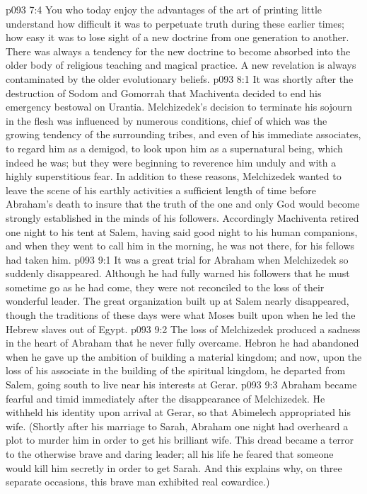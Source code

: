 \pc \vs p093 7:4 You who today enjoy the advantages of the art of printing little understand how difficult it was to perpetuate truth during these earlier times; how easy it was to lose sight of a new doctrine from one generation to another. There was always a tendency for the new doctrine to become absorbed into the older body of religious teaching and magical practice. A new revelation is always contaminated by the older evolutionary beliefs.
\vs p093 8:1 It was shortly after the destruction of Sodom and Gomorrah that Machiventa decided to end his emergency bestowal on Urantia. Melchizedek’s decision to terminate his sojourn in the flesh was influenced by numerous conditions, chief of which was the growing tendency of the surrounding tribes, and even of his immediate associates, to regard him as a demigod, to look upon him as a supernatural being, which indeed he was; but they were beginning to reverence him unduly and with a highly superstitious fear. In addition to these reasons, Melchizedek wanted to leave the scene of his earthly activities a sufficient length of time before Abraham’s death to insure that the truth of the one and only God would become strongly established in the minds of his followers. Accordingly Machiventa retired one night to his tent at Salem, having said good night to his human companions, and when they went to call him in the morning, he was not there, for his fellows had taken him.\plusone
{}
\vs p093 9:1 It was a great trial for Abraham when Melchizedek so suddenly disappeared. Although he had fully warned his followers that he must sometime go as he had come, they were not reconciled to the loss of their wonderful leader. The great organization built up at Salem nearly disappeared, though the traditions of these days were what Moses built upon when he led the Hebrew slaves out of Egypt.
\pc \vs p093 9:2 The loss of Melchizedek produced a sadness in the heart of Abraham that he never fully overcame. Hebron he had abandoned when he gave up the ambition of building a material kingdom; and now, upon the loss of his associate in the building of the spiritual kingdom, he departed from Salem, going south to live near his interests at Gerar.
\vs p093 9:3 Abraham became fearful and timid immediately after the disappearance of Melchizedek. He withheld his identity upon arrival at Gerar, so that Abimelech appropriated his wife. (Shortly after his marriage to Sarah, Abraham one night had overheard a plot to murder him in order to get his brilliant wife. This dread became a terror to the otherwise brave and daring leader; all his life he feared that someone would kill him secretly in order to get Sarah. And this explains why, on three separate occasions, this brave man exhibited real cowardice.)
